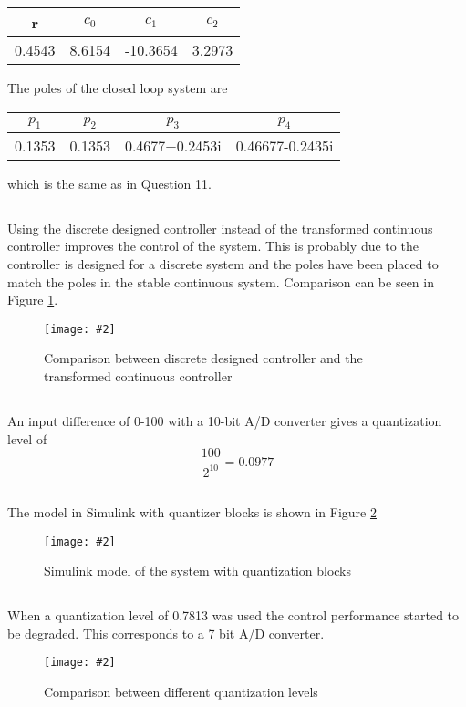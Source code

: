 \documentclass[12pt,a4paper]{article}
\newcommand{\fig}[4]{
    \begin{figure}[!h]
      \centering
      \texttt{[image: \#2]}
        \label{fig:#3}
        \caption{#4}
    \end{figure}
}
\begin{document}
\begin{center}
	\begin{tabular}{| c | c | c | c |}
	\hline
	r & $c_0$ & $c_1$ & $c_2$ \\
	\hline
	0.4543 & 8.6154 & -10.3654 & 3.2973 \\
	\hline
	\end{tabular}
\end{center}

The poles of the closed loop system are
\begin{center}
	\begin{tabular}{| c | c | c | c |}
	\hline
	$p_1$ & $p_2$ & $p_3$ & $p_4$ \\
	\hline
	0.1353 & 0.1353 & 0.4677+0.2453i & 0.46677-0.2435i\\
	\hline
	\end{tabular}
\end{center}
which is the same as in Question 11.

\subsection{}%
Using the discrete designed controller instead of the transformed continuous controller improves the control of the system. This is probably due to the controller is designed for a discrete system and the poles have been placed to match the poles in the stable continuous system. Comparison can be seen in Figure \ref{fig:ex17}.

\fig{0.6}{ex17.png}{ex17}{Comparison between discrete designed controller and the transformed continuous controller}

\subsection{}%
An input difference of 0-100 with a 10-bit A/D converter gives a quantization level of
\begin{equation}
	\frac{100}{2^{10}} = 0.0977
\end{equation}

\subsection{}%
The model in Simulink with quantizer blocks is shown in Figure \ref{fig:ex19}
\fig{0.8}{ex19.png}{ex19}{Simulink model of the system with quantization blocks}

\subsection{}%
When a quantization level of 0.7813 was used the control performance started to be degraded. This corresponds to a 7 bit A/D converter.

\fig{1}{ex20.png}{ex20}{Comparison between different quantization levels}
\end{document}

